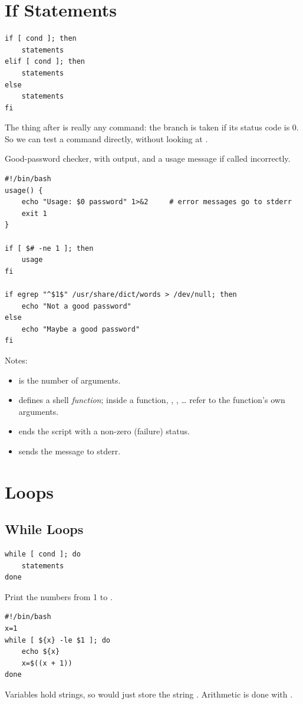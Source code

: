 \section{If Statements}
\begin{lstlisting}[style=bash]
if [ cond ]; then
    statements
elif [ cond ]; then
    statements
else
    statements
fi
\end{lstlisting}
The thing after  is really any command: the branch is taken if its
status code is 0. So we can test a command directly, without looking at
.

\begin{example}
Good-password checker, with output, and a usage message if called incorrectly.
\begin{lstlisting}[style=bash]
#!/bin/bash
usage() {
    echo "Usage: $0 password" 1>&2     # error messages go to stderr
    exit 1
}

if [ $# -ne 1 ]; then
    usage
fi

if egrep "^$1$" /usr/share/dict/words > /dev/null; then
    echo "Not a good password"
else
    echo "Maybe a good password"
fi
\end{lstlisting}
Notes:
\begin{itemize}
  \item \code{\$\#} is the number of arguments.
  \item {} defines a shell \emph{function}; inside a
        function, , , \dots{} refer to the function's own
        arguments.
  \item {} ends the script with a non-zero (failure) status.
  \item {} sends the message to stderr.
\end{itemize}
\end{example}

\section{Loops}

\subsection{While Loops}
\begin{lstlisting}[style=bash]
while [ cond ]; do
    statements
done
\end{lstlisting}

\begin{example}
Print the numbers from 1 to .
\begin{lstlisting}[style=bash]
#!/bin/bash
x=1
while [ ${x} -le $1 ]; do
    echo ${x}
    x=$((x + 1))
done
\end{lstlisting}
Variables hold strings, so  would just store the string
. Arithmetic is done with .
\end{example}


